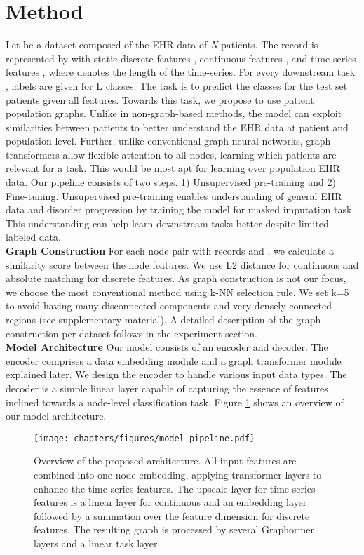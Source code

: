 \documentclass[runningheads]{llncs}
\begin{document}
 \section{Method}
Let  be a dataset composed of the EHR data of \textit{N} patients. The  record is represented by  with static discrete features  , continuous features , and time-series features  , where  denotes the length of the time-series.
For every downstream task , labels  are given for L classes. The task is to predict the classes for the test set patients given all features. Towards this task, we propose to use patient population graphs. 
Unlike in non-graph-based methods, the model can exploit similarities between patients to better understand the EHR data at patient and population level.
Further, unlike conventional graph neural networks, graph transformers allow flexible attention to all nodes, learning which patients are relevant for a task. This would be most apt for learning over population EHR data.
Our pipeline consists of two steps. 1) Unsupervised pre-training and 2) Fine-tuning. Unsupervised pre-training enables understanding of general EHR data and disorder progression by training the model for masked imputation task. This understanding can help learn downstream tasks better despite limited labeled data.\\
\textbf{Graph Construction}
For each node pair with records  and , we calculate a similarity score  between the node features. We use L2 distance for continuous and absolute matching for discrete features. As graph construction is not our focus, we choose the most conventional method using k-NN selection rule. We set k=5 to avoid having many disconnected components and very densely connected regions (see supplementary material). A detailed description of the graph construction per dataset follows in the experiment section.\\
\textbf{Model Architecture}
Our model consists of an encoder and decoder. The encoder comprises a data embedding module and a graph transformer module explained later. We design the encoder to handle various input data types. The decoder is a simple linear layer capable of capturing the essence of features inclined towards a node-level classification task. Figure \ref{arch_overview} shows an overview of our model architecture.\\
\begin{figure}[hbt!]
\centering
\texttt{[image: chapters/figures/model\_pipeline.pdf]}
\caption{Overview of the proposed architecture. All input features are combined into one node embedding, applying transformer layers to enhance the time-series features. The upscale layer for time-series features is a linear layer for continuous and an embedding layer followed by a summation over the feature dimension for discrete features. The resulting graph is processed by several Graphormer layers and a linear task layer.}
\label{arch_overview}
\end{figure}
\end{document}

